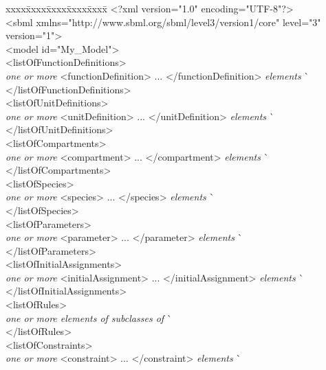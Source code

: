 \vspace*{2ex}
\begin{tt}
  \tightspacing
  \small
  \begin{tabbing}
xxxx\=xxxx\=xxxx\=xxxx\=xxxx\=\kill
\+\>
<?xml version="1.0" encoding="UTF-8"?>\\
<sbml xmlns="http://www.sbml.org/sbml/level3/version1/core" level="3" version="1">\\
\><model id="My\_Model">\\
\>\><listOfFunctionDefinitions>\\
\>\>\>\textrm{\emph{one or more}} <functionDefinition> ... </functionDefinition> \textrm{\emph{elements}}  \` \sayOptional\\
\>\></listOfFunctionDefinitions>\\
\>\><listOfUnitDefinitions>\\
\>\>\>\textrm{\emph{one or more}} <unitDefinition> ... </unitDefinition> \textrm{\emph{elements}}  \` \sayOptional\\
\>\></listOfUnitDefinitions>\\
\>\><listOfCompartments>\\
\>\>\>\textrm{\emph{one or more}} <compartment> ... </compartment> \textrm{\emph{elements}}  \` \sayOptional\\
\>\></listOfCompartments>\\
\>\><listOfSpecies>\\
\>\>\>\textrm{\emph{one or more}} <species> ... </species> \textrm{\emph{elements}}  \` \sayOptional\\
\>\></listOfSpecies>\\
\>\><listOfParameters>\\
\>\>\>\textrm{\emph{one or more}} <parameter> ... </parameter> \textrm{\emph{elements}}  \` \sayOptional\\
\>\></listOfParameters>\\
\>\><listOfInitialAssignments>\\
\>\>\>\textrm{\emph{one or more}} <initialAssignment> ... </initialAssignment> \textrm{\emph{elements}}  \` \sayOptional\\
\>\></listOfInitialAssignments>\\
\>\><listOfRules>\\
\>\>\>\textrm{\emph{one or more elements of subclasses of }}  \` \sayOptional\\
\>\></listOfRules>\\
\>\><listOfConstraints>\\
\>\>\>\textrm{\emph{one or more}} <constraint> ... </constraint> \textrm{\emph{elements}}  \` \sayOptional\\

\end{tabbing}
\end{tt}
